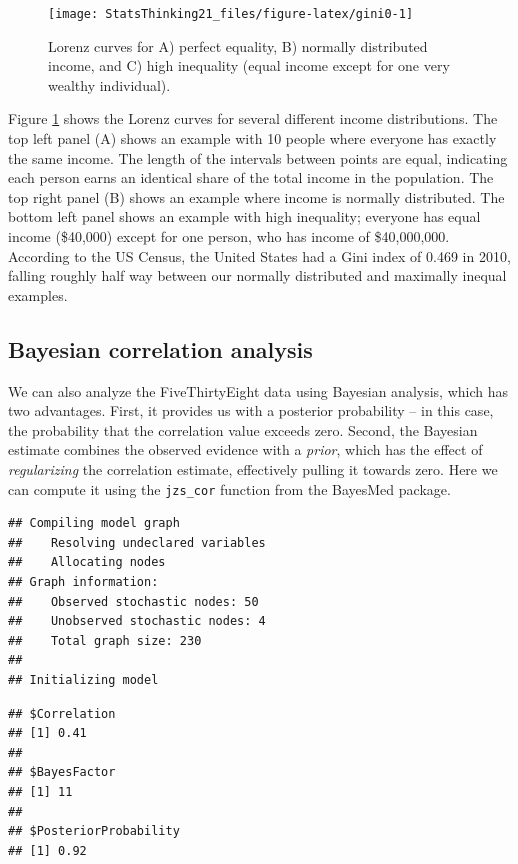 \documentclass[12pt,]{book}
\theoremstyle{definition}
\theoremstyle{definition}
\theoremstyle{definition}
\theoremstyle{remark}
\begin{document}
\begin{figure}
\texttt{[image: StatsThinking21\_files/figure-latex/gini0-1]} \caption{Lorenz curves for A) perfect equality, B) normally distributed income, and C) high inequality (equal income except for one very wealthy individual).}\label{fig:gini0}
\end{figure}

Figure \ref{fig:gini0} shows the Lorenz curves for several different income distributions. The top left panel (A) shows an example with 10 people where everyone has exactly the same income. The length of the intervals between points are equal, indicating each person earns an identical share of the total income in the population. The top right panel (B) shows an example where income is normally distributed. The bottom left panel shows an example with high inequality; everyone has equal income (\$40,000) except for one person, who has income of \$40,000,000. According to the US Census, the United States had a Gini index of 0.469 in 2010, falling roughly half way between our normally distributed and maximally inequal examples.

\hypertarget{bayesian-correlation-analysis}{%
\subsection{Bayesian correlation analysis}\label{bayesian-correlation-analysis}}

We can also analyze the FiveThirtyEight data using Bayesian analysis, which has two advantages. First, it provides us with a posterior probability -- in this case, the probability that the correlation value exceeds zero. Second, the Bayesian estimate combines the observed evidence with a \emph{prior}, which has the effect of \emph{regularizing} the correlation estimate, effectively pulling it towards zero. Here we can compute it using the \texttt{jzs\_cor} function from the BayesMed package.

\begin{verbatim}
## Compiling model graph
##    Resolving undeclared variables
##    Allocating nodes
## Graph information:
##    Observed stochastic nodes: 50
##    Unobserved stochastic nodes: 4
##    Total graph size: 230
## 
## Initializing model
\end{verbatim}

\begin{verbatim}
## $Correlation
## [1] 0.41
## 
## $BayesFactor
## [1] 11
## 
## $PosteriorProbability
## [1] 0.92
\end{verbatim}
\end{document}
